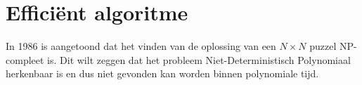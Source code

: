 \documentclass[11pt, a4paper]{article}
\begin{document}
\section*{Effici\"ent algoritme}
In 1986 is aangetoond dat het vinden van de oplossing van een $N \times N$ puzzel NP-compleet is. \cite{ratnerwarmuth1986} Dit wilt zeggen dat het probleem Niet-Deterministisch Polynomiaal herkenbaar is en dus niet gevonden kan worden binnen polynomiale tijd.

\printbibliography
\end{document}
